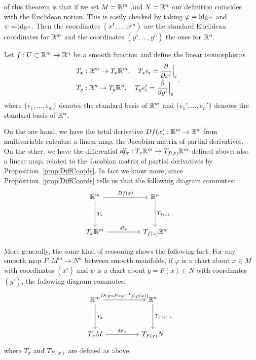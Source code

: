  of this theorem is that if we set $M=\mathbb{R}^m$ and $N=\mathbb{R}^n$ our definition coincides with the Euclidean notion.
This is easily checked by taking $\varphi = \operatorname{id}_{\mathbb{R}^m}$ and $\psi=\operatorname{id}_{\mathbb{R}^n}$.
Then the coordinates $(x^1,\ldots,x^m)$ are the standard Euclidean coordinates for $\mathbb{R}^m$ and the coordinates $(y^1,\ldots,y^n)$ the ones for $\mathbb{R}^n$.

Let $f:U\subset\mathbb{R}^m\to\mathbb{R}^n$ be a smooth function and define the linear isomorphisms
\begin{equation}\label{def:lin_iso_Tp}
	\begin{split}
		 & T_x : \mathbb{R}^m \to T_x\mathbb{R}^m,\quad T_x e_i = \frac{\partial}{\partial x^i}\Big|_x  \\
		 & T_y : \mathbb{R}^n \to T_y\mathbb{R}^n,\quad T_y e_i' = \frac{\partial}{\partial y^i}\Big|_y
	\end{split},
\end{equation}
where $\{e_1,\ldots,e_m\}$ denotes the standard basis of $\mathbb{R}^m$ and $\{e_1',\ldots,e_n'\}$ denotes the standard basis of $\mathbb{R}^n$.

On the one hand, we have the total derivative $Df(x):\mathbb{R}^m\to\mathbb{R}^n$ from multivariable calculus: a linear map, the Jacobian matrix of partial derivatives.
On the other, we have the differential $df_x : T_x \mathbb{R}^m \to T_{f(x)}\mathbb{R}^m$ defined above: also a linear map, related to the Jacobian matrix of partial derivatives by Proposition~\ref{prop:DiffCoords}.
In fact we know more, since Proposition~\ref{prop:DiffCoords} tells us that the following diagram commutes:
\begin{equation}
	\begin{tikzcd}[row sep=huge, column sep=huge]
		\R^m \arrow[r, "Df(x)"] \arrow[d, "T_x"]
		& \R^n \arrow[d, "T_{f(x)}"] \\
		T_x\R^m \arrow[r, "df_x"]
		& T_{f(x)}\R^n
	\end{tikzcd}.
\end{equation}

More generally, the same kind of reasoning shows the following fact. For any smooth map $F:M^m \to N^n$ between smooth manifolds, if $\varphi$ is a chart about $x\in M$ with coordinates $(x^i)$ and $\psi$ is a chart about $y=F(x)\in N$ with coordinates $(y^i)$, the following diagram commutes:
\begin{equation}
	\begin{tikzcd}[row sep=huge, column sep=huge]
		\R^m \arrow[r, "D(\psi \circ F \circ \varphi^{-1})(\varphi(x))"] \arrow[d, "T_x"]
		& \R^n \arrow[d, "T_{F(x)}"] \\
		T_xM \arrow[r, "dF_x"]
		& T_{F(x)}N
	\end{tikzcd},
\end{equation}
where $T_x$ and $T_{F(x)}$ are defined as above.

